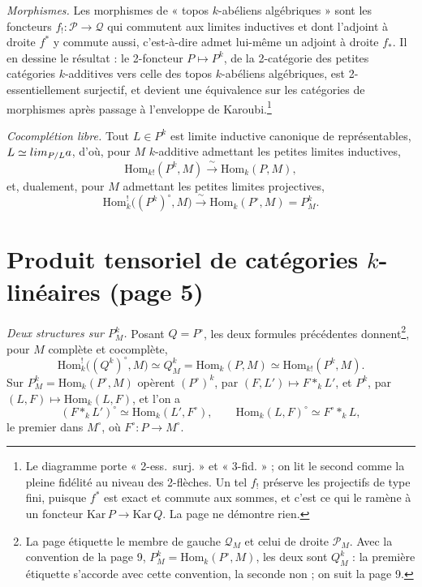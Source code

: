 \documentclass[11pt,a4paper]{article}
\begin{document}
\emph{Morphismes.} Les morphismes de « topos $k$-abéliens algébriques » sont
les foncteurs $f_{!} : \mathcal{P} \to \mathcal{Q}$ qui commutent aux limites
inductives et dont l'adjoint à droite $f^{*}$ y commute aussi, c'est-à-dire
admet lui-même un adjoint à droite $f_{*}$. Il en dessine le résultat : le
2-foncteur $P \mapsto P^{k}$, de la 2-catégorie des petites catégories
$k$-additives vers celle des topos $k$-abéliens algébriques, est
2-essentiellement surjectif, et devient une équivalence sur les catégories de
morphismes après passage à l'enveloppe de Karoubi.\footnote{Le diagramme porte
« 2-ess.\ surj. » et « 3-fid. » ; on lit le second comme la pleine fidélité au
niveau des 2-flèches. Un tel $f_{!}$ préserve les projectifs de type fini,
puisque $f^{*}$ est exact et commute aux sommes, et c'est ce qui le ramène à
un foncteur $\mathrm{Kar}\,P \to \mathrm{Kar}\,Q$. La page ne démontre rien.}

\emph{Cocomplétion libre.} Tout $L \in P^{k}$ est limite inductive canonique de
représentables, $L \simeq \varinjlim_{P/L} a$, d'où, pour $M$ $k$-additive
admettant les petites limites inductives,
\[
\mathrm{Hom}_{k!}(P^{k}, M) \xrightarrow{\;\sim\;} \mathrm{Hom}_{k}(P, M),
\]
et, dualement, pour $M$ admettant les petites limites projectives,
\[
\mathrm{Hom}^{!}_{k}\bigl((P^{k})^{\circ}, M\bigr) \xrightarrow{\;\sim\;}
\mathrm{Hom}_{k}(P^{\circ}, M) = P^{k}_{M}.
\]

\section*{Produit tensoriel de catégories $k$-linéaires (page 5)}

\emph{Deux structures sur $P^{k}_{M}$.} Posant $Q = P^{\circ}$, les deux formules
précédentes donnent\footnote{La page étiquette le membre de gauche
$\mathcal{Q}_{M}$ et celui de droite $\mathcal{P}_{M}$. Avec la convention de
la page 9, $P^{k}_{M} = \mathrm{Hom}_{k}(P^{\circ}, M)$, les deux sont
$Q^{k}_{M}$ : la première étiquette s'accorde avec cette convention, la
seconde non ; on suit la page 9.}, pour $M$ complète et cocomplète,
\[
\mathrm{Hom}^{!}_{k}\bigl((Q^{k})^{\circ}, M\bigr) \simeq Q^{k}_{M}
= \mathrm{Hom}_{k}(P, M) \simeq \mathrm{Hom}_{k!}(P^{k}, M).
\]
Sur $P^{k}_{M} = \mathrm{Hom}_{k}(P^{\circ}, M)$ opèrent
$(P^{\circ})^{k}$, par $(F, L') \mapsto F *_{k} L'$, et $P^{k}$, par
$(L, F) \mapsto \mathrm{Hom}_{k}(L, F)$, et l'on a
\[
(F *_{k} L')^{\circ} \simeq \mathrm{Hom}_{k}(L', F^{\circ}),
\qquad
\mathrm{Hom}_{k}(L, F)^{\circ} \simeq F^{\circ} *_{k} L ,
\]
le premier dans $M^{\circ}$, où $F^{\circ} : P \to M^{\circ}$.
\end{document}
